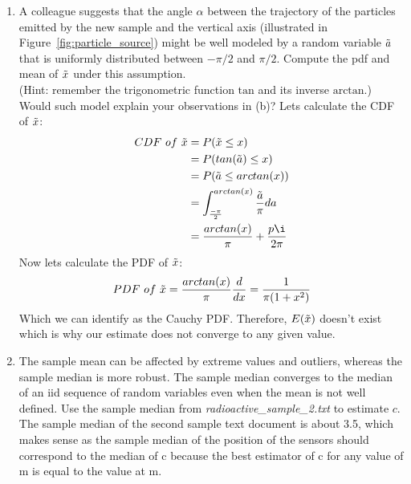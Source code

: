 \documentclass[12pt,twoside]{article}
\newcommand{\rnd}{\Tilde  }
\newcommand{\rx}{\rnd{ x}  }
\newcommand{\ra}{\rnd{ a}  }
\begin{document}
\begin{enumerate}
\begin{enumerate}
\item A colleague suggests that the angle $\alpha$ between the trajectory of the particles emitted by the new sample and the vertical axis (illustrated in Figure~\ref{fig:particle_source}) might be well modeled by a random variable $\ra$ that is uniformly distributed between $-\pi/2$ and $\pi/2$. Compute the pdf and mean of $\rx$ under this assumption. \\
 (Hint: remember the trigonometric function $\mathrm{tan}$ and its inverse $\mathrm{arctan}$.)\\ Would such model explain your observations in (b)?
 \subitem 
 Lets calculate the CDF of $\rx$:
 \begin{equation}
 \begin{split}
     CDF \ of \ \rx &= P(\rx \leq x) \\
     &= P(tan(\ra) \leq x) \\
     &= P(\ra \leq arctan(x)) \\
     &= \int_{\frac{-\pi}{2}}^{arctan(x)} \frac{\ra}{\pi} da \\
     &= \frac{arctan(x)}{\pi} + \frac{p\i}{2\pi}
 \end{split}
\end{equation}
Now lets calculate the PDF of $\rx$:
$$
    PDF \ of \ \rx = \frac{arctan(x)}{\pi}\frac{d}{dx} = \frac{1}{\pi(1 + x^2)}
$$
Which we can identify as the Cauchy PDF. Therefore, $E(\rx)$ doesn't exist which is why our estimate does not converge to any given value.
\item The sample mean can be affected by extreme values and outliers, whereas the sample median is more robust. The sample median converges to the median of an iid sequence of random variables even when the mean is not well defined. Use the sample median from \emph{radioactive\_sample\_2.txt} to estimate $c$. 
\subitem The sample median of the second sample text document is about 3.5, which makes sense as the sample median of the position of the sensors should correspond to the median of c because the best estimator of c for any value of m is equal to the value at m.

\end{enumerate}
\end{enumerate}



\end{document}
